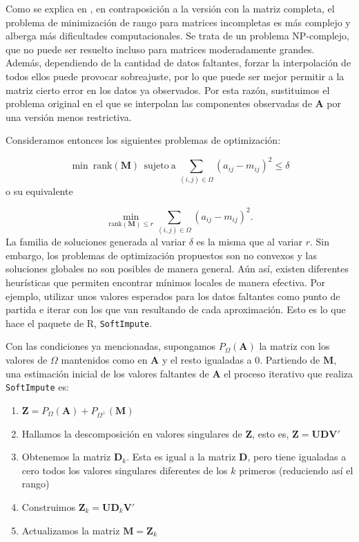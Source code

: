 \documentclass[tfg,cienciasbased,lot,lof,covers,final,overleaf,nocopyright]{tfgtfmthesisuam}
\begin{document}
Como se explica en \cite{Hastie}, en contraposición a la versión con la matriz completa, el problema de minimización de rango para matrices incompletas es más complejo y alberga más dificultades computacionales. Se trata de un problema NP-complejo, que no puede ser resuelto incluso para matrices moderadamente grandes. Además, dependiendo de la cantidad de datos faltantes, forzar la interpolación de todos ellos puede provocar sobreajuste, por lo que puede ser mejor permitir a la matriz cierto error en los datos ya observados. Por esta razón, sustituimos el problema original en el que se interpolan las componentes observadas de $\mathbf{A}$ por una versión menos restrictiva.

Consideramos entonces los siguientes problemas de optimización:

\begin{equation*}
    \min\  \mbox{rank}(\mathbf{M})\  \mathrm{\ sujeto\ a\ } \sum_{(i,j) \in \Omega} (a_{ij} -  m_{ij})^2 \leq \delta
\end{equation*}
o su equivalente

\begin{equation*}
    \min_{\mbox{rank}(\mathbf{M}) \leq r} \sum_{(i,j) \in \Omega} (a_{ij} -  m_{ij})^2.
\end{equation*}
La familia de soluciones generada al variar $\delta$ es la misma que al variar $r$. Sin embargo, los problemas de optimización propuestos son no convexos y las soluciones globales no son posibles de manera general. Aún así, existen diferentes heurísticas que permiten encontrar mínimos locales de manera efectiva. Por ejemplo, utilizar unos valores esperados para los datos faltantes como punto de partida e iterar con los que van resultando de cada aproximación. Esto es lo que hace el paquete de R, \texttt{SoftImpute}.

Con las condiciones ya mencionadas, supongamos $P_\Omega (\mathbf{A})$ la matriz con los valores de $\Omega$ mantenidos como en $\mathbf{A}$ y el resto igualadas a $0$. Partiendo de $\mathbf{M}$, una estimación inicial de los valores faltantes de $\mathbf{A}$ el proceso iterativo que realiza \texttt{SoftImpute} es:

\begin{enumerate}
    \item $\mathbf{Z} = P_\Omega(\mathbf{A}) + P_{\Omega^{\bot}}(\mathbf{M})$
    \item Hallamos la descomposición en valores singulares de $\mathbf{Z}$, esto es, $\mathbf{Z=UDV'}$
    \item Obtenemos la matriz $\mathbf{D}_k$. Esta es igual a la matriz $\mathbf{D}$, pero tiene igualadas a cero todos los valores singulares diferentes de los $k$ primeros (reduciendo así el rango)
    \item Construimos $\mathbf{Z}_k=\mathbf{UD}_k\mathbf{V'}$
    \item Actualizamos la matriz $\mathbf{M=Z}_k$
\end{enumerate}
\end{document}
